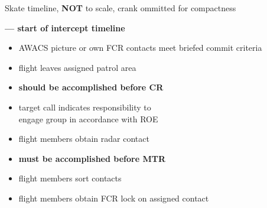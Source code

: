 \begin{checklistenumerate}[start=0]
{
        \caption{Skate timeline, \textbf{NOT} to scale, crank ommitted for compactness}
        \label{fig:ttpaa:timeline:skate}
    }%
    \textbf{--- start of intercept timeline}
    \begin{itemize}
        \item AWACS picture or own FCR contacts meet briefed commit criteria
        \item flight leaves assigned patrol area
        \item \textbf{should be accomplished before CR}
    \end{itemize}

    \blueitem[Target]
    \label{subsec:ttpaa:timeline:skate:target}
    \begin{itemize}
        \item target call indicates responsibility to \\
        engage group in accordance with ROE
        \item flight members obtain radar contact
        \item \textbf{must be accomplished before MTR}
    \end{itemize}

    \blueitem[Sort]
    \label{subsec:ttpaa:timeline:skate:sort}
    \begin{itemize}
        \item flight members sort contacts
        \item flight members obtain FCR lock on assigned contact
    \end{itemize}


\end{checklistenumerate}
